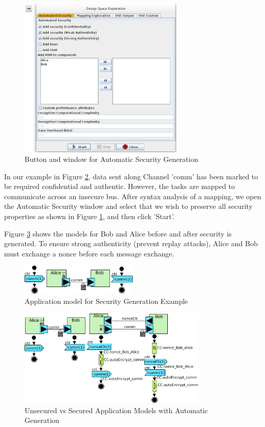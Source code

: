 \documentclass{llncs}
\begin{document}
\begin{figure}[htbp]
	\centering
 	\includegraphics[width=0.7\textwidth]{figures/securityStuff/autoSec.png}
	\caption{Button and window for Automatic Security Generation}
	\label{fig:autosec}
\end{figure}

In our example in Figure \ref{fig:autogenexample}, data sent along Channel 'comm' has been marked to be required confidential and authentic. However, the tasks are mapped to communicate across an insecure bus. After syntax analysis of a mapping, we open the Automatic Security window and select that we wish to preserve all security properties as shown in Figure \ref{fig:autosec}, and  then click 'Start'.

Figure \ref{fig:autogenres} shows the models for Bob and Alice before and after security is generated. To ensure strong authenticity (prevent replay attacks), Alice and Bob must exchange a nonce before each message exchange.


\begin{figure}[htbp]
	\centering
 	\includegraphics[width=0.5\textwidth]{figures/securityStuff/secComp.pdf}
	\caption{Application model for Security Generation Example}
	\label{fig:autogenexample}
\end{figure}


\begin{figure}[htbp]
	\centering
 	\includegraphics[width=0.8\textwidth]{figures/securityStuff/secCompRes.pdf}
	\caption{Unsecured vs Secured Application Models with Automatic Generation}
	\label{fig:autogenres}
\end{figure}
%
%
%
\newpage
\end{document}
